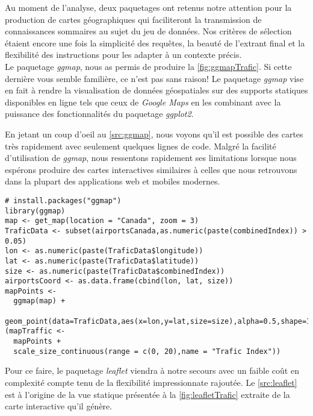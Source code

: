 \noindent
Au moment de l'analyse, deux paquetages ont retenus notre attention pour la production de cartes géographiques qui faciliteront la transmission de connaissances sommaires au sujet du jeu de données. Nos critères de sélection étaient encore une fois la simplicité des requêtes, la beauté de l'extrant final et la flexibilité des instructions pour les adapter à un contexte précis. \\

\noindent
Le paquetage \emph{ggmap}, nous as permis de produire la \autoref{fig:ggmapTrafic}. Si cette dernière vous semble familière, ce n'est pas sans raison! Le paquetage \emph{ggmap} vise en fait à rendre la visualisation de données géospatiales sur des supports statiques disponibles en ligne tels que ceux de \emph{Google Maps} en les combinant avec la puissance des fonctionnalités du paquetage \emph{ggplot2}. \cite{Rpackage:ggmap} \\


\noindent
En jetant un coup d'oeil au \autoref{src:ggmap}, nous voyons qu'il est possible des cartes très rapidement avec seulement quelques lignes de code. Malgré la facilité d'utilisation de \emph{ggmap}, nous ressentons rapidement ses limitations lorsque nous espérons produire des cartes interactives similaires à celles que nous retrouvons dans la plupart des applications web et mobiles modernes. \\

\begin{lstlisting}[caption = Générer une carte du trafic aérien avec \emph{ggmap},label=src:ggmap]
# install.packages("ggmap")
library(ggmap)
map <- get_map(location = "Canada", zoom = 3)
TraficData <- subset(airportsCanada,as.numeric(paste(combinedIndex)) > 0.05)
lon <- as.numeric(paste(TraficData$longitude))
lat <- as.numeric(paste(TraficData$latitude))
size <- as.numeric(paste(TraficData$combinedIndex))
airportsCoord <- as.data.frame(cbind(lon, lat, size))
mapPoints <- 
  ggmap(map) + 
  geom_point(data=TraficData,aes(x=lon,y=lat,size=size),alpha=0.5,shape=16)
(mapTraffic <-  
  mapPoints + 
  scale_size_continuous(range = c(0, 20),name = "Trafic Index"))
\end{lstlisting}

\noindent
Pour ce faire, le paquetage \emph{leaflet} viendra à notre secours avec un faible coût en complexité compte tenu de la flexibilité impressionnate rajoutée. Le \autoref{src:leaflet} est à l'origine de la vue statique présentée à la \autoref{fig:leafletTrafic} extraite de la carte interactive qu'il génère. \\

